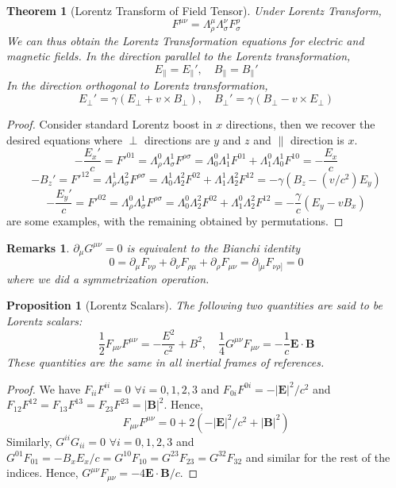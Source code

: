 \documentclass[a4paper]{article}
\newtheorem{remarks}{Remarks}[section]
\theoremstyle{new}
\newtheorem{thm}{Theorem}[section]
\newtheorem{prop}{Proposition}[section]
\begin{document}
\begin{thm}[Lorentz Transform of Field Tensor]
Under Lorentz Transform,
$$F^{\mu\nu}=\Lambda^\mu_\rho\Lambda^\nu_\sigma F^\rho_\sigma$$
We can thus obtain the Lorentz Transformation equations for electric and magnetic fields. In the direction parallel to the Lorentz transformation,
$$E_\parallel=E_\parallel', \quad B_\parallel=B_\parallel'$$
In the direction orthogonal to Lorentz transformation,
$$E_\perp'=\gamma(E_\perp+v\times B_\perp),\quad B_\perp'=\gamma(B_\perp-v\times E_\perp)$$
\end{thm}
\begin{proof}
Consider standard Lorentz boost in $x$ directions, then we recover the desired equations where $\perp$ directions are $y$ and $z$ and $\parallel$ direction is $x$.
$$-\frac{E_x'}{c}=F'^{01}=\Lambda_\rho^0\Lambda_\sigma^1F^{\rho\sigma}=\Lambda_0^0\Lambda_1^1F^{01}+\Lambda_1^0\Lambda_0^1F^{10}=-\frac{E_x}{c}$$
$$-B_z'=F'^{12}=\Lambda_\rho^1\Lambda_\sigma^2F^{\rho\sigma}=\Lambda_0^1\Lambda_2^2F^{02}+\Lambda_1^1\Lambda_2^2F^{12}=-\gamma(B_z-(v/c^2)E_y)$$
$$-\frac{E_y'}{c}=F'^{02}=\Lambda_\rho^0\Lambda_\sigma^1F^{\rho\sigma}=\Lambda_0^0\Lambda_2^2F^{02}+\Lambda_1^0\Lambda_2^2F^{12}=-\frac{\gamma}{c}(E_y-vB_x)$$
are some examples, with the remaining obtained by permutations.
\end{proof}
\begin{remarks}
$\partial_\mu G^{\mu\nu}=0$ is equivalent to the Bianchi identity
$$0=\partial_\mu F_{\nu\rho}+\partial_\nu F_{\rho\mu}+\partial_\rho F_{\mu\nu}=\partial_{[\mu}F_{\nu\rho]}=0$$
where we did a symmetrization operation.
\end{remarks}
\begin{prop}[Lorentz Scalars]
The following two quantities are said to be Lorentz scalars:
$$\frac{1}{2}F_{\mu\nu}F^{\mu\nu}=-\frac{E^2}{c^2}+B^2,\quad\frac{1}{4}G^{\mu\nu}F_{\mu\nu}=-\frac{1}{c}\mathbf{E}\cdot\mathbf{B}$$
These quantities are the same in all inertial frames of references.
\end{prop}
\begin{proof}
We have $F_{ii}F^{ii}=0$ $\forall i=0,1,2,3$ and $F_{0i}F^{0i}=-|\mathbf{E}|^2/c^2$ and $F_{12}F^{12}=F_{13}F^{13}=F_{23}F^{23}=|\mathbf{B}|^2$. Hence,
$$F_{\mu\nu}F^{\mu\nu}=0+2(-|\mathbf{E}|^2/c^2+|\mathbf{B}|^2)$$
Similarly, $G^{ii}G_{ii}=0$ $\forall i=0,1,2,3$ and $G^{01}F_{01}=-B_xE_x/c=G^{10}F_{10}=G^{23}F_{23}=G^{32}F_{32}$ and similar for the rest of the indices. Hence, $G^{\mu\nu}F_{\mu\nu}=-4\mathbf{E}\cdot\mathbf{B}/c$.
\end{proof}
\end{document}
